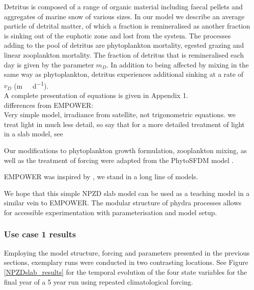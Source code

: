 \documentclass[template.tex]{subfiles}
\begin{document}
Detritus is composed of a range of organic material including faecal pellets and aggregates of marine snow of various sizes. In our model we describe an average particle of detrital matter, of which a fraction is remineralised as another fraction is sinking out of the euphotic zone and lost from the system. The processes adding to the pool of detritus are phytoplankton mortality, egested grazing and linear zooplankton mortality. The fraction of detritus that is remineralised each day is given by the parameter $m_D$. In addition to being affected by mixing in the same way as phytoplankton, detritus experiences additional sinking at a rate of $v_D$ (\unit{m \ d^{-1}}).\\

A complete presentation of equations is given in Appendix 1.\\

differences from EMPOWER: \\
Very simple model,
irradiance from satellite, not trigonometric equations. we treat light in much less detail, so say that for a more detailed treatment of light in a slab model, see \cite{Anderson2015c}

Our modifications to phytoplankton growth formulation, zooplankton mixing, as well as the treatment of forcing were adapted from the PhytoSFDM model \cite{Acevedo-Trejos2016}.

EMPOWER was inspired by \cite{Fasham1990a}, we stand in a long line of models. 

We hope that this simple NPZD slab model can be used as a teaching model in a similar vein to EMPOWER. The modular structure of phydra processes allows for accessible experimentation with parameterisation and model setup. 



\subsubsection{Use case 1 results}
Employing the model structure, forcing and parameters presented in the previous sections, exemplary runs were conducted in two contrasting locations. See Figure \ref{NPZDslab_results} for the temporal evolution of the four state variables for the final year of a 5 year run using repeated climatological forcing. 
\end{document}
